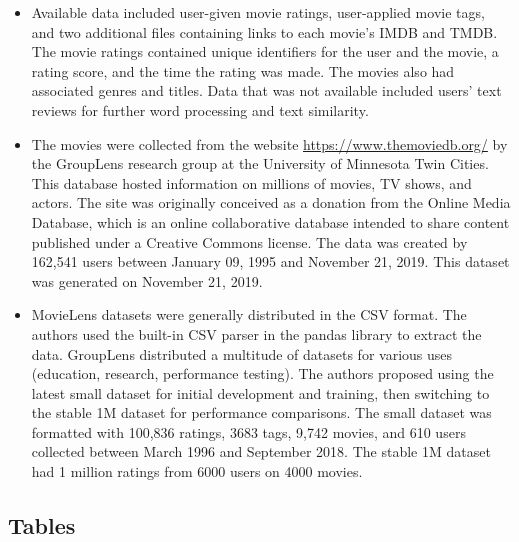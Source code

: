 \documentclass{article}
\begin{document}
\begin{itemize}
\item Available data included user-given movie ratings, user-applied movie tags, and two additional files containing links to each movie's IMDB and TMDB. The movie ratings contained unique identifiers for the user and the movie, a rating score, and the time the rating was made. The movies also had associated genres and titles. Data that was not available included users' text reviews for further word processing and text similarity.
\item The movies were collected from the website \url{https://www.themoviedb.org/} by the GroupLens research group at the University of Minnesota Twin Cities. This database hosted information on millions of movies, TV shows, and actors. The site was originally conceived as a donation from the Online Media Database, which is an online collaborative database intended to share content published under a Creative Commons license. The data was created by 162,541 users between January 09, 1995 and November 21, 2019. This dataset was generated on November 21, 2019.
\item MovieLens datasets were generally distributed in the CSV format. The authors used the built-in CSV parser in the pandas library to extract the data. GroupLens distributed a multitude of datasets for various uses (education, research, performance testing). The authors proposed using the latest small dataset for initial development and training, then switching to the stable 1M dataset for performance comparisons. The small dataset was formatted with 100,836 ratings, 3683 tags, 9,742 movies, and 610 users collected between March 1996 and September 2018. The stable 1M dataset had 1 million ratings from 6000 users on 4000 movies.

\end{itemize}




\subsection{Tables}
\end{document}
